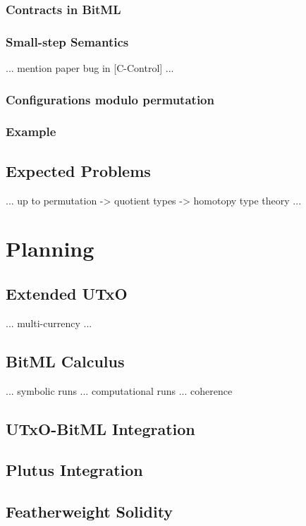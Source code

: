 \documentclass[acmsmall,nonacm=true,screen=true]{acmart}
\begin{document}
\subsubsection{Contracts in BitML}
\subsubsection{Small-step Semantics}
... mention paper bug in [C-Control] ...
\subsubsection{Configurations modulo permutation}
\subsubsection{Example}

\subsection{Expected Problems}
... up to permutation -> quotient types -> homotopy type theory ...

\newpage
\section{Planning}
\label{sec:plan}

\subsection{Extended UTxO}
... multi-currency ... 

\subsection{BitML Calculus}
... symbolic runs ... computational runs ... coherence

\subsection{UTxO-BitML Integration}

\subsection{Plutus Integration}

\subsection{Featherweight Solidity}
\end{document}
